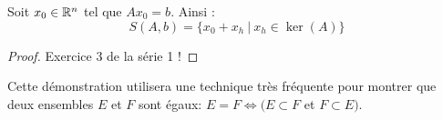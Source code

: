 \begin{boxthm}
Soit $x_0 \in \mathbb{R}^n$ tel que $Ax_0 = b$. Ainsi :
$$
S(A,b) = \{x_0 + x_h \ | \ x_h \in \ker(A)\}
$$
\end{boxthm}
\begin{proof}
Exercice 3 de la série 1 !
\end{proof}

Cette démonstration utilisera une technique très fréquente pour montrer que deux ensembles $E$ et $F$ sont égaux: $E = F \iff (E \subset F$ et $F \subset E)$. \\

